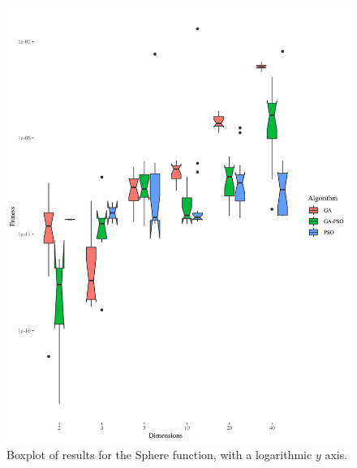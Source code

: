 \documentclass[runningheads]{llncs}
\begin{document}
                 \begin{figure}[h!tb]
              \centering
                \includegraphics[height=0.5\textheight]{img/sphere-boxplot.png}
              \caption{Boxplot of results for the Sphere function, with a logarithmic $y$ axis.\label{fig:boxplot:sphere}}
            \end{figure}
%
\end{document}

